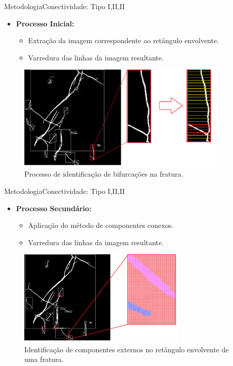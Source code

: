 \documentclass{beamer}
\begin{document}
\begin{frame}{Metodologia}{Conectividade: Tipo I,II,II}
    
    \begin{itemize}
        \item \textbf{Processo Inicial:}
        \begin{itemize}
            \item Extração da imagem correspondente ao retângulo envolvente.
            \item Varredura das linhas da imagem resultante.
        \end{itemize}
    \end{itemize}
    
    \begin{figure}[!htb]
    \centering
    \includegraphics[width=10cm]{fig/conect.png}\\
    \scriptsize{Processo de identificação de bifurcações na fratura.}
    \end{figure}
        

\end{frame}

\begin{frame}{Metodologia}{Conectividade: Tipo I,II,II}
    \begin{itemize}
        \item \textbf{Processo Secundário:}
        \begin{itemize}
        \item Aplicação do método de componentes conexos.
        \item Varredura das linhas da imagem resultante.
    \end{itemize}
    \end{itemize}
    
    
    \begin{figure}[!htb]
    \centering
    \includegraphics[width=8cm]{fig/conectividade.png}\\
    \scriptsize{Identificação de componentes externos no retângulo envolvente de uma fratura.}
    \label{fig:conectividade}
    \end{figure}

\end{frame}
\end{document}
